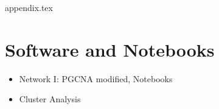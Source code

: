 \newpage

\begin{appendices}

{appendix.tex}

\chapter{Software and Notebooks} \label{s:ap:software}

\begin{itemize}
    \item Network I: PGCNA modified, Notebooks
    \item Cluster Analysis
\end{itemize}

\end{appendices}

